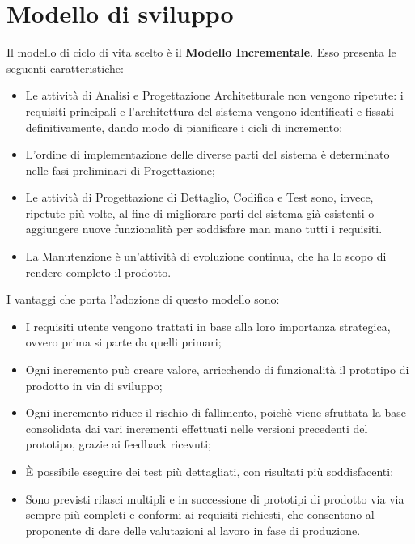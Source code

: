 \newpage
\section{Modello di sviluppo}
Il modello di ciclo di vita scelto è il \textbf{Modello Incrementale}. Esso presenta le seguenti caratteristiche:
\begin{itemize}
	\item Le attività di Analisi e Progettazione Architetturale non vengono ripetute: i requisiti principali e l'architettura del sistema vengono identificati e fissati definitivamente, dando modo di pianificare i cicli di incremento;
	\item L'ordine di implementazione delle diverse parti del sistema è determinato nelle fasi preliminari di Progettazione;
	\item Le attività di Progettazione di Dettaglio, Codifica e Test sono, invece, ripetute più volte, al fine di migliorare parti del sistema già esistenti o aggiungere nuove funzionalità per soddisfare man mano tutti i requisiti.
	\item La Manutenzione è un'attività di evoluzione continua, che ha lo scopo di rendere completo il prodotto.
\end{itemize}
I vantaggi che porta l'adozione di questo modello sono:
\begin{itemize}
	\item I requisiti utente vengono trattati in base alla loro importanza strategica, ovvero prima si parte da quelli primari;
	\item Ogni incremento può creare valore, arricchendo di funzionalità il prototipo di prodotto in via di sviluppo;
	\item Ogni incremento riduce il rischio di fallimento, poichè viene sfruttata la base consolidata dai vari incrementi effettuati nelle versioni precedenti del prototipo, grazie ai feedback ricevuti; 
	\item {\MakeUppercase{è}} possibile eseguire dei test più dettagliati, con risultati più soddisfacenti;
	\item Sono previsti rilasci multipli e in successione di prototipi di prodotto via via sempre più completi e conformi ai requisiti richiesti, che consentono al proponente di dare delle valutazioni al lavoro in fase di produzione.
\end{itemize}
